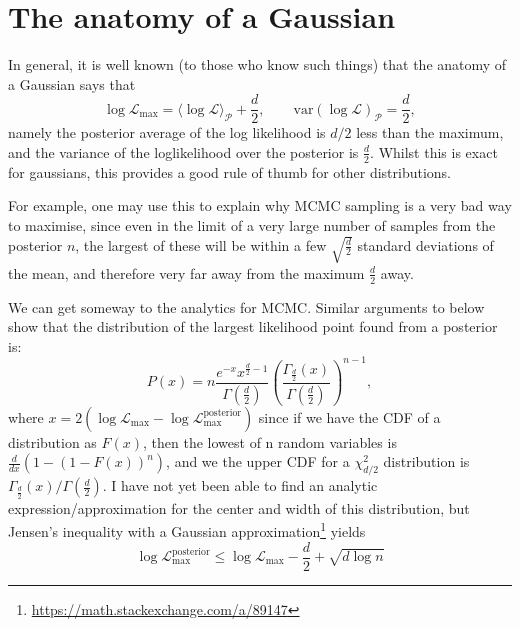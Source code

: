 \documentclass[usenatbib]{mnras}
\begin{document}
\section{The anatomy of a Gaussian}

In general, it is well known (to those who know such things) that the anatomy of a Gaussian says that
\begin{equation}
    \boxed{\log\mathcal{L}_\mathrm{max} = \langle\log\mathcal{L}\rangle_\mathcal{P} + \frac{d}{2}},  \qquad \boxed{\mathrm{var}(\log\mathcal{L})_\mathcal{P} = \frac{d}{2}},
\end{equation}
namely the posterior average of the log likelihood is $d/2$ less than the maximum, and the variance of the loglikelihood over the posterior is $\frac{d}{2}$. Whilst this is exact for gaussians, this provides a good rule of thumb for other distributions. 

For example, one may use this to explain why MCMC sampling is a very bad way to maximise, since even in the limit of a very large number of samples from the posterior $n$, the largest of these will be within a few $\sqrt{\frac{d}{2}}$ standard deviations of the mean, and therefore very far away from the maximum $\frac{d}{2}$ away.

We can get someway to the analytics for MCMC. Similar arguments to below show that the distribution of the largest likelihood point found from a posterior is:
\begin{equation}
    P(x) = n \frac{e^{-x} x^{\frac{d}{2}-1} }{\Gamma\left(\frac{d}{2}\right)} {\left( \frac{\Gamma_{\frac{d}{2}}(x)}{\Gamma(\frac{d}{2})} \right)}^{n-1},
\end{equation}
where $x=2(\log\mathcal{L}_\mathrm{max}-\log\mathcal{L}_\mathrm{max}^\mathrm{posterior})$
since if we have the CDF of a distribution as $F(x)$, then the lowest of n random variables is $\frac{d}{dx}( 1- (1-F(x))^n)$, and we the upper CDF for a $\chi^2_{d/2}$ distribution is $\Gamma_{\frac{d}{2}}(x)/\Gamma(\frac{d}{2})$. I have not yet been able to find an analytic expression/approximation for the center and width of this distribution, but Jensen's inequality with a Gaussian approximation\footnote{\url{https://math.stackexchange.com/a/89147}} yields
\begin{equation}
    \log\mathcal{L}_\mathrm{max}^\mathrm{posterior} \le  \log\mathcal{L}_\mathrm{max} - \frac{d}{2} + \sqrt{d\log n} 
\end{equation}
\end{document}
